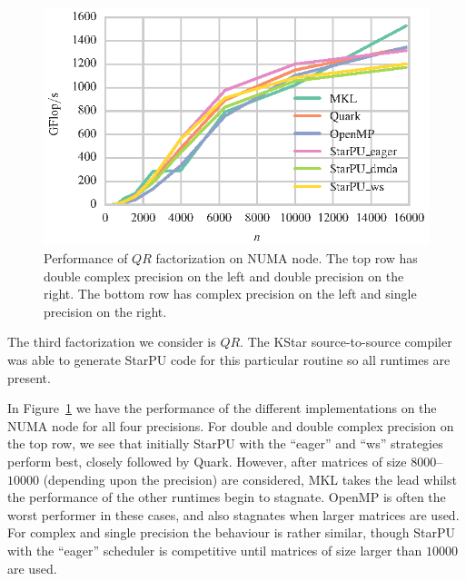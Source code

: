 \documentclass[a4paper,12pt]{article}
\begin{document}
\begin{figure}[t]
  \includegraphics[scale=.85]{fig/kebnekaise_sgeqrf_weak_scaling.eps}
  \caption{Performance of $QR$ factorization on NUMA node.
    The top row has double complex precision on the left and double
    precision on the right.
    The bottom row has complex precision on the left and single
    precision on the right.}
  \label{fig.qr_numa}
\end{figure}

The third factorization we consider is $QR$.
The KStar source-to-source compiler was able to generate StarPU
code for this particular routine so all runtimes are present.

In Figure~\ref{fig.qr_numa} we have the performance of the different
implementations on the NUMA node for all four precisions.
For double and double complex precision on the top row,
we see that initially StarPU with the ``eager'' and ``ws'' strategies
perform best, closely followed by Quark.
However,
after matrices of size $8000$--$10000$ (depending upon the precision)
are considered,
MKL takes the lead whilst the
performance of the other runtimes begin to stagnate.
OpenMP is often the worst performer in these cases,
and also stagnates when larger matrices are used.
For complex and single precision the behaviour is rather similar,
though StarPU with the ``eager'' scheduler is competitive until
matrices of size larger than $10000$ are used.
\end{document}
